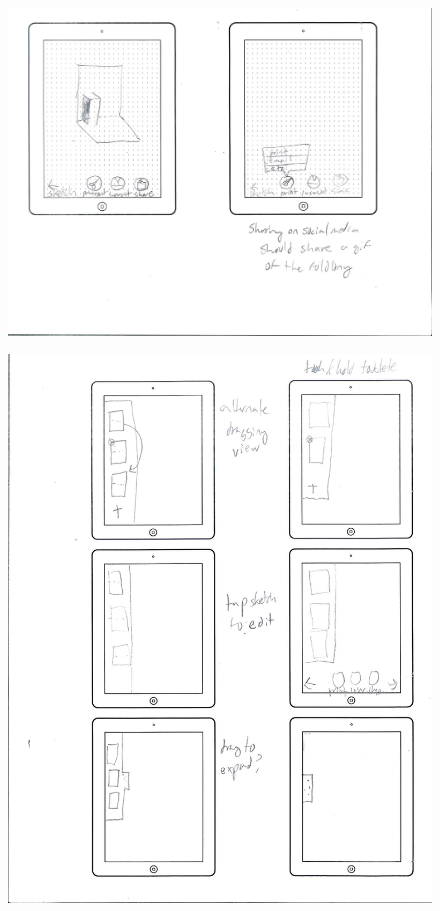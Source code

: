 \begin{figure}[htbp]
\centering
\includegraphics{figures/90_Appendix_UI_Mockups/009.png}
\caption{}
\end{figure}

\begin{figure}[htbp]
\centering
\includegraphics{figures/90_Appendix_UI_Mockups/010.png}
\caption{}
\end{figure}

